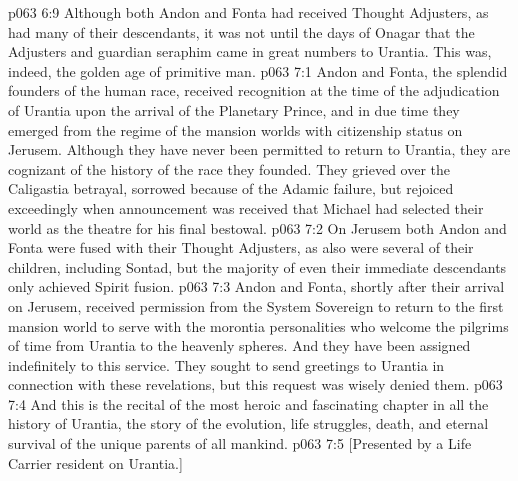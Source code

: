 \vs p063 6:9 Although both Andon and Fonta had received Thought Adjusters, as had many of their descendants, it was not until the days of Onagar that the Adjusters and guardian seraphim came in great numbers to Urantia. This was, indeed, the golden age of primitive man.
\vs p063 7:1 Andon and Fonta, the splendid founders of the human race, received recognition at the time of the adjudication of Urantia upon the arrival of the Planetary Prince, and in due time they emerged from the regime of the mansion worlds with citizenship status on Jerusem. Although they have never been permitted to return to Urantia, they are cognizant of the history of the race they founded. They grieved over the Caligastia betrayal, sorrowed because of the Adamic failure, but rejoiced exceedingly when announcement was received that Michael had selected their world as the theatre for his final bestowal.
\vs p063 7:2 On Jerusem both Andon and Fonta were fused with their Thought Adjusters, as also were several of their children, including Sontad, but the majority of even their immediate descendants only achieved Spirit fusion.
\vs p063 7:3 Andon and Fonta, shortly after their arrival on Jerusem, received permission from the System Sovereign to return to the first mansion world to serve with the morontia personalities who welcome the pilgrims of time from Urantia to the heavenly spheres. And they have been assigned indefinitely to this service. They sought to send greetings to Urantia in connection with these revelations, but this request was wisely denied them.
\vs p063 7:4 \pc And this is the recital of the most heroic and fascinating chapter in all the history of Urantia, the story of the evolution, life struggles, death, and eternal survival of the unique parents of all mankind.
\vsetoff
\vs p063 7:5 [Presented by a Life Carrier resident on Urantia.]
